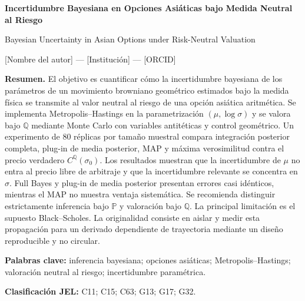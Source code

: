\documentclass[12pt,letterpaper]{article}
\newif\ifblind
\begin{document}

\begin{center}
{\Large\bfseries Incertidumbre Bayesiana en Opciones Asiáticas bajo Medida Neutral al Riesgo\par}
\vspace{0.35cm}
{\large Bayesian Uncertainty in Asian Options under Risk-Neutral Valuation\par}
\vspace{0.6cm}
\ifblind
{\normalsize Manuscrito anónimo para revisión por pares\par}
\else
{\normalsize [Nombre del autor] --- [Institución] --- [ORCID]\par}
\fi
\end{center}

\vspace{0.5cm}

\textbf{Resumen.} El objetivo es cuantificar cómo la incertidumbre bayesiana de los parámetros de un movimiento browniano geométrico estimados bajo la medida física se transmite al valor neutral al riesgo de una opción asiática aritmética. Se implementa Metropolis--Hastings en la parametrización $(\mu,\log\sigma)$ y se valora bajo $\mathbb Q$ mediante Monte Carlo con variables antitéticas y control geométrico. Un experimento de 80 réplicas por tamaño muestral compara integración posterior completa, plug-in de media posterior, MAP y máxima verosimilitud contra el precio verdadero $C^{\mathbb Q}(\sigma_0)$. Los resultados muestran que la incertidumbre de $\mu$ no entra al precio libre de arbitraje y que la incertidumbre relevante se concentra en $\sigma$. Full Bayes y plug-in de media posterior presentan errores casi idénticos, mientras el MAP no muestra ventaja sistemática. Se recomienda distinguir estrictamente inferencia bajo $\mathbb P$ y valoración bajo $\mathbb Q$. La principal limitación es el supuesto Black--Scholes. La originalidad consiste en aislar y medir esta propagación para un derivado dependiente de trayectoria mediante un diseño reproducible y no circular.

\textbf{Palabras clave:} inferencia bayesiana; opciones asiáticas; Metropolis--Hastings; valoración neutral al riesgo; incertidumbre paramétrica.

\textbf{Clasificación JEL:} C11; C15; C63; G13; G17; G32.
\end{document}

